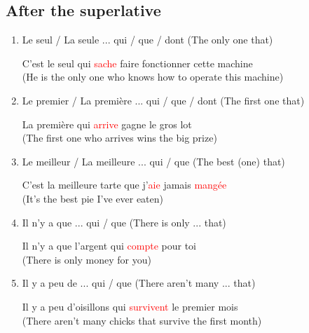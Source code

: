 \documentclass{book}
\begin{document}
    \subsection{After the superlative}
        \begin{enumerate}
            \item Le seul / La seule ... qui / que / dont (The only one that)
                \begin{center}
                    C'est le seul qui \textcolor{red}{sache} faire fonctionner cette machine \\
                    (He is the only one who knows how to operate this machine)
                \end{center}

            \item Le premier / La première ... qui / que / dont (The first one that)
                \begin{center}
                    La première qui \textcolor{red}{arrive} gagne le gros lot \\
                    (The first one who arrives wins the big prize)
                \end{center}

            \item Le meilleur / La meilleure ... qui / que (The best (one) that)
                \begin{center}
                    C'est la meilleure tarte que j'\textcolor{red}{aie} jamais \textcolor{red}{mangée} \\
                    (It's the best pie I've ever eaten)
                \end{center}
            
            \item Il n'y a que ... qui / que (There is only ... that)
                \begin{center}
                    Il n'y a que l'argent qui \textcolor{red}{compte} pour toi \\
                    (There is only money for you)
                \end{center}
            
            \item Il y a peu de ... qui / que (There aren't many ... that)
                \begin{center}
                    Il y a peu d'oisillons qui \textcolor{red}{survivent} le premier mois \\
                    (There aren't many chicks that survive the first month)
                \end{center}
        \end{enumerate}
\end{document}
